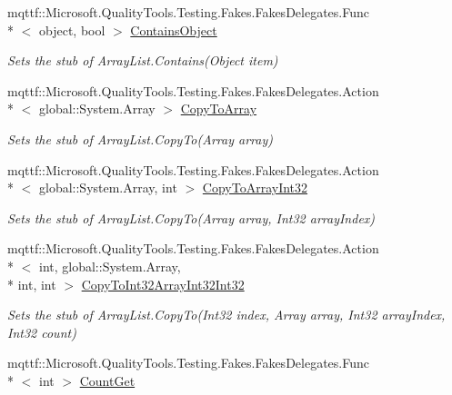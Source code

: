\begin{DoxyCompactItemize}
mqttf\-::\-Microsoft.\-Quality\-Tools.\-Testing.\-Fakes.\-Fakes\-Delegates.\-Func\\*
$<$ object, bool $>$ \hyperlink{class_system_1_1_collections_1_1_fakes_1_1_stub_array_list_ab726442d4260de262bdcced35f63a372}{Contains\-Object}
\begin{DoxyCompactList}\small\item\em Sets the stub of Array\-List.\-Contains(\-Object item)\end{DoxyCompactList}\item 
mqttf\-::\-Microsoft.\-Quality\-Tools.\-Testing.\-Fakes.\-Fakes\-Delegates.\-Action\\*
$<$ global\-::\-System.\-Array $>$ \hyperlink{class_system_1_1_collections_1_1_fakes_1_1_stub_array_list_a24179e9300f981c0067977230d882fd2}{Copy\-To\-Array}
\begin{DoxyCompactList}\small\item\em Sets the stub of Array\-List.\-Copy\-To(\-Array array)\end{DoxyCompactList}\item 
mqttf\-::\-Microsoft.\-Quality\-Tools.\-Testing.\-Fakes.\-Fakes\-Delegates.\-Action\\*
$<$ global\-::\-System.\-Array, int $>$ \hyperlink{class_system_1_1_collections_1_1_fakes_1_1_stub_array_list_a3f4a90cb068aafa7e956635dc663135d}{Copy\-To\-Array\-Int32}
\begin{DoxyCompactList}\small\item\em Sets the stub of Array\-List.\-Copy\-To(\-Array array, Int32 array\-Index)\end{DoxyCompactList}\item 
mqttf\-::\-Microsoft.\-Quality\-Tools.\-Testing.\-Fakes.\-Fakes\-Delegates.\-Action\\*
$<$ int, global\-::\-System.\-Array, \\*
int, int $>$ \hyperlink{class_system_1_1_collections_1_1_fakes_1_1_stub_array_list_ac003ed605985617d10eb17f6e8ea144c}{Copy\-To\-Int32\-Array\-Int32\-Int32}
\begin{DoxyCompactList}\small\item\em Sets the stub of Array\-List.\-Copy\-To(\-Int32 index, Array array, Int32 array\-Index, Int32 count)\end{DoxyCompactList}\item 
mqttf\-::\-Microsoft.\-Quality\-Tools.\-Testing.\-Fakes.\-Fakes\-Delegates.\-Func\\*
$<$ int $>$ \hyperlink{class_system_1_1_collections_1_1_fakes_1_1_stub_array_list_abc83a079c0d4b0bb23eccc981499f3ba}{Count\-Get}

\end{DoxyCompactItemize}
